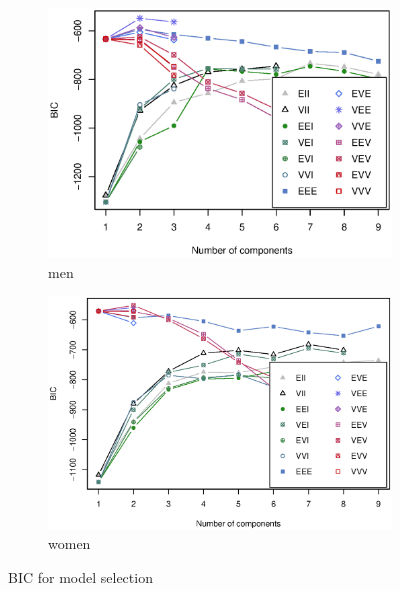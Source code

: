 \documentclass{article}
\begin{document}
\begin{itemize}[leftmargin = 0 em]
\begin{figure}[!htb]
          \begin{subfigure}[b]{0.5\linewidth}
            \centering
            \includegraphics[width = \textwidth]{bic.eps}
            \caption{men}
          \end{subfigure}%
          \begin{subfigure}[b]{0.5\linewidth}
            \centering
            \includegraphics[width = \textwidth]{bic_women.eps}
            \caption{women}
          \end{subfigure}
          \caption{BIC for model selection}
          \label{bic}
\end{figure}


\end{itemize}
\end{document}
